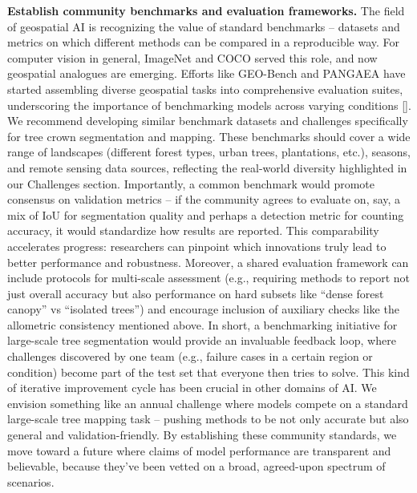 \documentclass[runningheads]{llncs}
\begin{document}
\textbf{Establish community benchmarks and evaluation frameworks.} The
field of geospatial AI is recognizing the value of standard benchmarks
-- datasets and metrics on which different methods can be compared in a
reproducible way. For computer vision in general, ImageNet and COCO
served this role, and now geospatial analogues are emerging. Efforts
like GEO-Bench and PANGAEA have started assembling diverse geospatial
tasks into comprehensive evaluation suites, underscoring the importance
of benchmarking models across varying conditions
{[}\cite{marsocci2024pangaea}{]}. We recommend developing similar
benchmark datasets and challenges specifically for tree crown
segmentation and mapping. These benchmarks should cover a wide range of
landscapes (different forest types, urban trees, plantations, etc.),
seasons, and remote sensing data sources, reflecting the real-world
diversity highlighted in our Challenges section. Importantly, a common
benchmark would promote consensus on validation metrics -- if the
community agrees to evaluate on, say, a mix of IoU for segmentation
quality and perhaps a detection metric for counting accuracy, it would
standardize how results are reported. This comparability accelerates
progress: researchers can pinpoint which innovations truly lead to
better performance and robustness. Moreover, a shared evaluation
framework can include protocols for multi-scale assessment (e.g.,
requiring methods to report not just overall accuracy but also
performance on hard subsets like ``dense forest canopy'' vs ``isolated
trees'') and encourage inclusion of auxiliary checks like the allometric
consistency mentioned above. In short, a benchmarking initiative for
large-scale tree segmentation would provide an invaluable feedback loop,
where challenges discovered by one team (e.g., failure cases in a
certain region or condition) become part of the test set that everyone
then tries to solve. This kind of iterative improvement cycle has been
crucial in other domains of AI. We envision something like an annual
challenge where models compete on a standard large-scale tree mapping
task -- pushing methods to be not only accurate but also general and
validation-friendly. By establishing these community standards, we move
toward a future where claims of model performance are transparent and
believable, because they've been vetted on a broad, agreed-upon spectrum
of scenarios.
\end{document}
